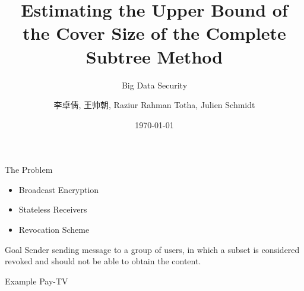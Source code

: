 \documentclass[10pt]{beamer}
\title{Estimating the Upper Bound of the Cover Size of the Complete Subtree Method}
\subtitle{Big Data Security}
\date{\today}
\author{李卓倩, 王帅朝, Raziur Rahman Totha, Julien Schmidt}
\institute{Shanghai Jiao Tong University}
\begin{document}
\maketitle

\begin{frame}{The Problem}
  \begin{itemize}
    \item Broadcast Encryption
    \item Stateless Receivers
    \item Revocation Scheme
  \end{itemize}

  \begin{block}{Goal}
  Sender sending message to a group of users, in which a subset is considered revoked and should not be able to obtain the content.
  \end{block}
  \pause

  \begin{exampleblock}{Example}
    Pay-TV
  \end{exampleblock}
\end{frame}
\end{document}
